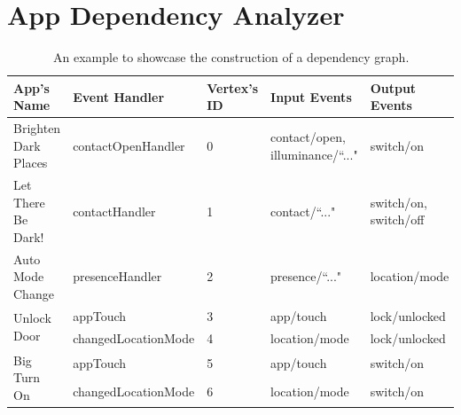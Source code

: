 \chapter{App Dependency Analyzer}
\label{sec:depedency}

\begin{table}[bt]
\scriptsize
\ssp
\caption{An example to showcase the construction of a dependency graph.}
\label{dgconstructiontb}
\centering
\begin{tabular}{| p{2.7cm} | l | p{1.5cm} | p{2.6cm} | p{2.5cm} |}
\hline
\bf App's Name & \bf Event Handler & \bf Vertex's ID & \bf Input Events & \bf Output Events\\
\hline
Brighten Dark Places & contactOpenHandler & 0 & contact/open, illuminance/``..." &  switch/on\\
\hline
Let There Be Dark! & contactHandler & 1 & contact/``..." &  switch/on, switch/off\\
\hline
Auto Mode Change & presenceHandler & 2 & presence/``..." &  location/mode\\
\hline
\multirow{2}{2.7cm}{Unlock Door}  & appTouch & 3 & app/touch & lock/unlocked\\ \cline{2-5}
	& changedLocationMode & 4 & location/mode & lock/unlocked\\
\hline
\multirow{2}{3cm}{Big Turn On}  & appTouch & 5 & app/touch & switch/on\\ \cline{2-5}
	& changedLocationMode & 6 & location/mode & switch/on\\
\hline
\end{tabular}
\end{table}

